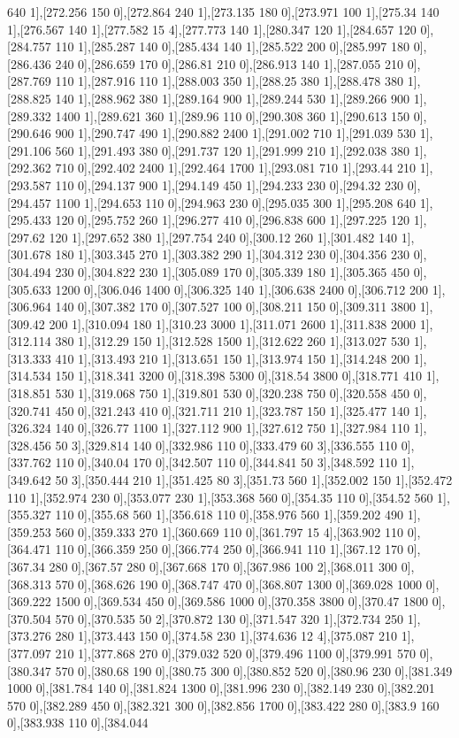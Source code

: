 {640 1],[272.256 150 0],[272.864 240 1],[273.135 180 0],[273.971 100 1],[275.34 140 1],[276.567 140 1],[277.582 15 4],[277.773 140 1],[280.347 120 1],[284.657 120 0],[284.757 110 1],[285.287 140 0],[285.434 140 1],[285.522 200 0],[285.997 180 0],[286.436 240 0],[286.659 170 0],[286.81 210 0],[286.913 140 1],[287.055 210 0],[287.769 110 1],[287.916 110 1],[288.003 350 1],[288.25 380 1],[288.478 380 1],[288.825 140 1],[288.962 380 1],[289.164 900 1],[289.244 530 1],[289.266 900 1],[289.332 1400 1],[289.621 360 1],[289.96 110 0],[290.308 360 1],[290.613 150 0],[290.646 900 1],[290.747 490 1],[290.882 2400 1],[291.002 710 1],[291.039 530 1],[291.106 560 1],[291.493 380 0],[291.737 120 1],[291.999 210 1],[292.038 380 1],[292.362 710 0],[292.402 2400 1],[292.464 1700 1],[293.081 710 1],[293.44 210 1],[293.587 110 0],[294.137 900 1],[294.149 450 1],[294.233 230 0],[294.32 230 0],[294.457 1100 1],[294.653 110 0],[294.963 230 0],[295.035 300 1],[295.208 640 1],[295.433 120 0],[295.752 260 1],[296.277 410 0],[296.838 600 1],[297.225 120 1],[297.62 120 1],[297.652 380 1],[297.754 240 0],[300.12 260 1],[301.482 140 1],[301.678 180 1],[303.345 270 1],[303.382 290 1],[304.312 230 0],[304.356 230 0],[304.494 230 0],[304.822 230 1],[305.089 170 0],[305.339 180 1],[305.365 450 0],[305.633 1200 0],[306.046 1400 0],[306.325 140 1],[306.638 2400 0],[306.712 200 1],[306.964 140 0],[307.382 170 0],[307.527 100 0],[308.211 150 0],[309.311 3800 1],[309.42 200 1],[310.094 180 1],[310.23 3000 1],[311.071 2600 1],[311.838 2000 1],[312.114 380 1],[312.29 150 1],[312.528 1500 1],[312.622 260 1],[313.027 530 1],[313.333 410 1],[313.493 210 1],[313.651 150 1],[313.974 150 1],[314.248 200 1],[314.534 150 1],[318.341 3200 0],[318.398 5300 0],[318.54 3800 0],[318.771 410 1],[318.851 530 1],[319.068 750 1],[319.801 530 0],[320.238 750 0],[320.558 450 0],[320.741 450 0],[321.243 410 0],[321.711 210 1],[323.787 150 1],[325.477 140 1],[326.324 140 0],[326.77 1100 1],[327.112 900 1],[327.612 750 1],[327.984 110 1],[328.456 50 3],[329.814 140 0],[332.986 110 0],[333.479 60 3],[336.555 110 0],[337.762 110 0],[340.04 170 0],[342.507 110 0],[344.841 50 3],[348.592 110 1],[349.642 50 3],[350.444 210 1],[351.425 80 3],[351.73 560 1],[352.002 150 1],[352.472 110 1],[352.974 230 0],[353.077 230 1],[353.368 560 0],[354.35 110 0],[354.52 560 1],[355.327 110 0],[355.68 560 1],[356.618 110 0],[358.976 560 1],[359.202 490 1],[359.253 560 0],[359.333 270 1],[360.669 110 0],[361.797 15 4],[363.902 110 0],[364.471 110 0],[366.359 250 0],[366.774 250 0],[366.941 110 1],[367.12 170 0],[367.34 280 0],[367.57 280 0],[367.668 170 0],[367.986 100 2],[368.011 300 0],[368.313 570 0],[368.626 190 0],[368.747 470 0],[368.807 1300 0],[369.028 1000 0],[369.222 1500 0],[369.534 450 0],[369.586 1000 0],[370.358 3800 0],[370.47 1800 0],[370.504 570 0],[370.535 50 2],[370.872 130 0],[371.547 320 1],[372.734 250 1],[373.276 280 1],[373.443 150 0],[374.58 230 1],[374.636 12 4],[375.087 210 1],[377.097 210 1],[377.868 270 0],[379.032 520 0],[379.496 1100 0],[379.991 570 0],[380.347 570 0],[380.68 190 0],[380.75 300 0],[380.852 520 0],[380.96 230 0],[381.349 1000 0],[381.784 140 0],[381.824 1300 0],[381.996 230 0],[382.149 230 0],[382.201 570 0],[382.289 450 0],[382.321 300 0],[382.856 1700 0],[383.422 280 0],[383.9 160 0],[383.938 110 0],[384.044 }
